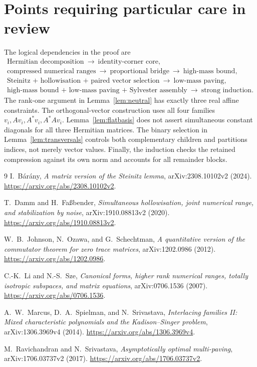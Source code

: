 \documentclass[11pt]{article}
\theoremstyle{remark}
\numberwithin{equation}{section}
\begin{document}
\section{Points requiring particular care in review}
The logical dependencies in the proof are
\[
\begin{gathered}
 \text{Hermitian decomposition}\ \longrightarrow\ \text{identity-corner core},\\
 \text{compressed numerical ranges}\ \longrightarrow\
 \text{proportional bridge}\ \longrightarrow\ \text{high-mass bound},\\
 \text{Steinitz + hollowisation + paired vector selection}
 \ \longrightarrow\ \text{low-mass paving},\\
 \text{high-mass bound + low-mass paving + Sylvester assembly}
 \ \longrightarrow\ \text{strong induction}.
\end{gathered}
\]
The rank-one argument in Lemma~\ref{lem:neutral} has exactly three real affine
constraints. The orthogonal-vector construction uses all four families
$v_i,Av_i,A^*v_i,A^*Av_i$. Lemma~\ref{lem:flatbasis} does not assert simultaneous
constant diagonals for all three Hermitian matrices. The binary selection in
Lemma~\ref{lem:transversals} controls both complementary children and partitions
indices, not merely vector values. Finally, the induction checks the retained
compression against its own norm and accounts for all remainder blocks.

\begin{thebibliography}{9}
I.~B\'ar\'any,
\emph{A matrix version of the Steinitz lemma},
arXiv:2308.10102v2 (2024).
\url{https://arxiv.org/abs/2308.10102v2}.

T.~Damm and H.~Fa\ss bender,
\emph{Simultaneous hollowisation, joint numerical range, and stabilization by noise},
arXiv:1910.08813v2 (2020).
\url{https://arxiv.org/abs/1910.08813v2}.

W.~B.~Johnson, N.~Ozawa, and G.~Schechtman,
\emph{A quantitative version of the commutator theorem for zero trace matrices},
arXiv:1202.0986 (2012).
\url{https://arxiv.org/abs/1202.0986}.

C.-K.~Li and N.-S.~Sze,
\emph{Canonical forms, higher rank numerical ranges, totally isotropic subspaces,
and matrix equations},
arXiv:0706.1536 (2007).
\url{https://arxiv.org/abs/0706.1536}.

A.~W.~Marcus, D.~A.~Spielman, and N.~Srivastava,
\emph{Interlacing families II: Mixed characteristic polynomials and the
Kadison--Singer problem},
arXiv:1306.3969v4 (2014).
\url{https://arxiv.org/abs/1306.3969v4}.

M.~Ravichandran and N.~Srivastava,
\emph{Asymptotically optimal multi-paving},
arXiv:1706.03737v2 (2017).
\url{https://arxiv.org/abs/1706.03737v2}.
\end{thebibliography}
\end{document}
